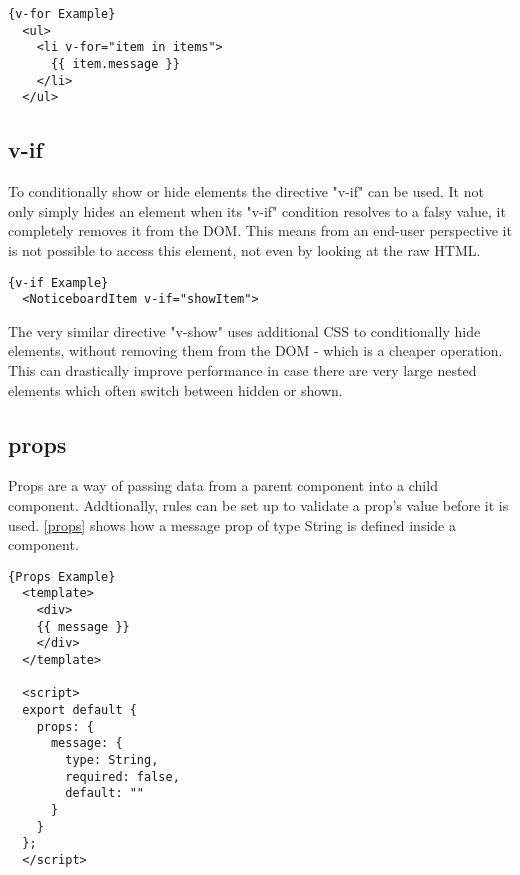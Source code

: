 \begin{lstlisting}[caption=v-for Example, captionpos=b, style=htmlcssjs, label=vmodel]{v-for Example}
  <ul>
    <li v-for="item in items">
      {{ item.message }}
    </li>
  </ul>
\end{lstlisting}

\subsection{v-if}
To conditionally show or hide elements the directive "v-if" can be used. It not only simply hides an element when its "v-if" condition resolves to a falsy value, it completely removes it from the DOM. This means from an end-user perspective it is not possible to access this element, not even by looking at the raw HTML. \newline

\begin{lstlisting}[caption=v-if Example, captionpos=b, style=htmlcssjs, label=vmodel]{v-if Example}
  <NoticeboardItem v-if="showItem">
\end{lstlisting}

The very similar directive "v-show" uses additional CSS to conditionally hide elements, without removing them from the DOM - which is a cheaper operation. This can drastically improve performance in case there are very large nested elements which often switch between hidden or shown.

\subsection{props}
Props are a way of passing data from a parent component into a child component. Addtionally, rules can be set up to validate a prop's value before it is used. \autoref{props} shows how a message prop of type String is defined inside a component. \newline

\begin{lstlisting}[caption=Props Example, captionpos=b, style=htmlcssjs, label=props]{Props Example}
  <template>
    <div>
    {{ message }}
    </div>
  </template>

  <script>
  export default {
    props: {
      message: {
        type: String,
        required: false,
        default: ""
      }
    }
  };
  </script>
\end{lstlisting}

